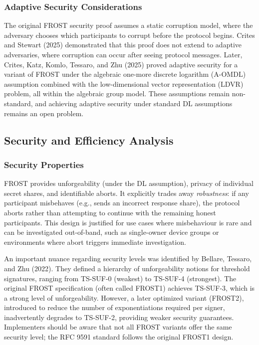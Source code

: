 \subsubsection{Adaptive Security Considerations}

The original FROST security proof assumes a static corruption model, where the adversary chooses which participants to corrupt before the protocol begins. Crites and Stewart (2025) demonstrated that this proof does not extend to adaptive adversaries, where corruption can occur after seeing protocol messages. Later, Crites, Katz, Komlo, Tessaro, and Zhu (2025) proved adaptive security for a variant of FROST under the algebraic one-more discrete logarithm (A-OMDL) assumption combined with the low-dimensional vector representation (LDVR) problem, all within the algebraic group model. These assumptions remain non-standard, and achieving adaptive security under standard DL assumptions remains an open problem.

\subsection{Security and Efficiency Analysis}

\subsubsection{Security Properties}

FROST provides unforgeability (under the DL assumption), privacy of individual secret shares, and identifiable aborts. It explicitly trades away \emph{robustness}: if any participant misbehaves (e.g., sends an incorrect response share), the protocol aborts rather than attempting to continue with the remaining honest participants. This design is justified for use cases where misbehaviour is rare and can be investigated out-of-band, such as single-owner device groups or environments where abort triggers immediate investigation.

An important nuance regarding security levels was identified by Bellare, Tessaro, and Zhu (2022). They defined a hierarchy of unforgeability notions for threshold signatures, ranging from TS-SUF-0 (weakest) to TS-SUF-4 (strongest). The original FROST specification (often called FROST1) achieves TS-SUF-3, which is a strong level of unforgeability. However, a later optimized variant (FROST2), introduced to reduce the number of exponentiations required per signer, inadvertently degrades to TS-SUF-2, providing weaker security guarantees. Implementers should be aware that not all FROST variants offer the same security level; the RFC 9591 standard follows the original FROST1 design.

